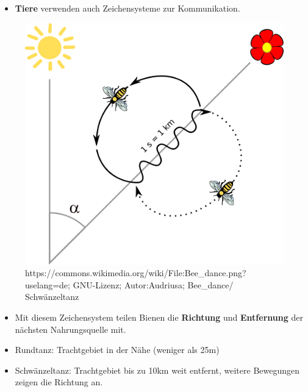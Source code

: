 \begin{frame}

\begin{itemize}
	\item<1-> \textbf{Tiere} verwenden auch Zeichensysteme zur Kommunikation.
\end{itemize}			
			



\begin{figure}[H]
\centering

\includegraphics[scale=0.15]{material/Bee_dance}
\caption{https://commons.wikimedia.org/wiki/File:Bee_dance.png?uselang=de; GNU-Lizenz; Autor:Audriusa; Bee_dance/ Schwänzeltanz}
\label{Zeichen2}
\end{figure}


\begin{itemize}
	\item<2-> Mit diesem Zeichensystem teilen Bienen die \textbf{Richtung} und \textbf{Entfernung} der nächsten Nahrungsquelle mit. 
	\item<2-> Rundtanz: Trachtgebiet in der Nähe (weniger als 25m)
	\item<2-> Schwänzeltanz: Trachtgebiet bis zu 10km weit entfernt, weitere Bewegungen zeigen die Richtung an.
\end{itemize}		
		
\end{frame}			

